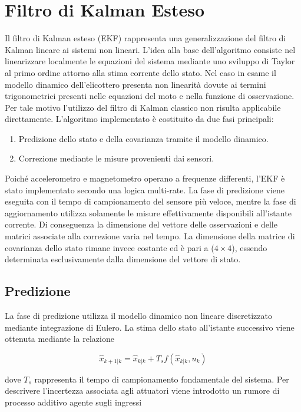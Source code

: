 \documentclass[12pt,a4paper]{article}
\begin{document}
\section{Filtro di Kalman Esteso}
Il filtro di Kalman esteso (EKF) rappresenta una generalizzazione del filtro di Kalman lineare ai sistemi non lineari. L'idea alla base dell'algoritmo consiste nel linearizzare localmente le equazioni del sistema mediante uno sviluppo di Taylor al primo ordine attorno alla stima corrente dello stato.
Nel caso in esame il modello dinamico dell'elicottero presenta non linearità dovute ai termini trigonometrici presenti nelle equazioni del moto e nella funzione di osservazione. Per tale motivo l'utilizzo del filtro di Kalman classico non risulta applicabile direttamente.
L'algoritmo implementato è costituito da due fasi principali:
\begin{enumerate}
\item Predizione dello stato e della covarianza tramite il modello dinamico.
\item Correzione mediante le misure provenienti dai sensori.
\end{enumerate}
Poiché accelerometro e magnetometro operano a frequenze differenti, l'EKF è stato implementato secondo una logica multi-rate. La fase di predizione viene eseguita con il tempo di campionamento del sensore più veloce, mentre la fase di aggiornamento utilizza solamente le misure effettivamente disponibili all'istante corrente.
Di conseguenza la dimensione del vettore delle osservazioni e delle matrici associate alla correzione varia nel tempo. La dimensione della matrice di covarianza dello stato rimane invece costante ed è pari a ($4\times4$), essendo determinata esclusivamente dalla dimensione del vettore di stato.

\subsection{Predizione}
La fase di predizione utilizza il modello dinamico non lineare discretizzato mediante integrazione di Eulero.
La stima dello stato all'istante successivo viene ottenuta mediante la relazione

\begin{equation}
\hat{x}_{k+1|k} = \hat{x}_{k|k} + T_s f(\hat{x}_{k|k},u_k)
\end{equation}

dove $T_s$ rappresenta il tempo di campionamento fondamentale del sistema.
Per descrivere l'incertezza associata agli attuatori viene introdotto un rumore di processo additivo agente sugli ingressi
\end{document}

